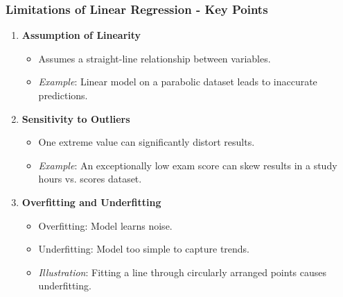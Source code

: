 \documentclass[aspectratio=169]{beamer}
\begin{document}
\begin{frame}[fragile]
    \frametitle{Limitations of Linear Regression - Key Points}
    \begin{enumerate}
        \item \textbf{Assumption of Linearity}
            \begin{itemize}
                \item Assumes a straight-line relationship between variables.
                \item \textit{Example}: Linear model on a parabolic dataset leads to inaccurate predictions.
            \end{itemize}
        \item \textbf{Sensitivity to Outliers}
            \begin{itemize}
                \item One extreme value can significantly distort results.
                \item \textit{Example}: An exceptionally low exam score can skew results in a study hours vs. scores dataset.
            \end{itemize}
        \item \textbf{Overfitting and Underfitting}
            \begin{itemize}
                \item Overfitting: Model learns noise.
                \item Underfitting: Model too simple to capture trends.
                \item \textit{Illustration}: Fitting a line through circularly arranged points causes underfitting.
            \end{itemize}
    \end{enumerate}
\end{frame}
\end{document}
